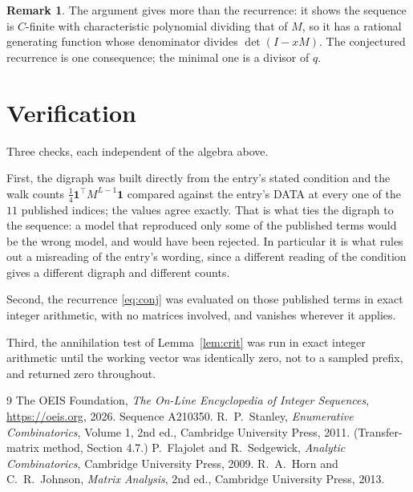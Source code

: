 \documentclass[11pt,a4paper]{article}
\theoremstyle{plain}
\theoremstyle{definition}
\newtheorem{remark}[theorem]{Remark}
\begin{document}
\begin{remark}
The argument gives more than the recurrence: it shows the sequence is $C$-finite with
characteristic polynomial dividing that of $M$, so it has a rational generating function
whose denominator divides $\det(I-xM)$. The conjectured recurrence is one consequence; the
minimal one is a divisor of $q$.
\end{remark}

\section{Verification}

Three checks, each independent of the algebra above.

First, the digraph was built directly from the entry's stated condition and the walk counts
$\tfrac1{4}\mathbf{1}^{\!\top}M^{L-1}\mathbf{1}$ compared against the entry's DATA at
every one of the $11$ published indices; the values agree exactly. That is what ties
the digraph to the sequence: a model that reproduced only some of the published terms would
be the wrong model, and would have been rejected. In particular it is what rules out a
misreading of the entry's wording, since a different reading of the condition gives a
different digraph and different counts.

Second, the recurrence \eqref{eq:conj} was evaluated on those published terms in exact
integer arithmetic, with no matrices involved, and vanishes wherever it applies.

Third, the annihilation test of Lemma~\ref{lem:crit} was run in exact integer arithmetic
until the working vector was identically zero, not to a sampled prefix, and returned zero
throughout.

\begin{thebibliography}{9}
 The OEIS Foundation, \emph{The On-Line Encyclopedia of Integer
Sequences}, \url{https://oeis.org}, 2026. Sequence A210350.
 R.~P.~Stanley, \emph{Enumerative Combinatorics}, Volume 1, 2nd ed.,
Cambridge University Press, 2011. (Transfer-matrix method, Section 4.7.)
 P.~Flajolet and R.~Sedgewick, \emph{Analytic Combinatorics}, Cambridge
University Press, 2009.
 R.~A.~Horn and C.~R.~Johnson, \emph{Matrix Analysis}, 2nd ed., Cambridge
University Press, 2013.
\end{thebibliography}
\end{document}
